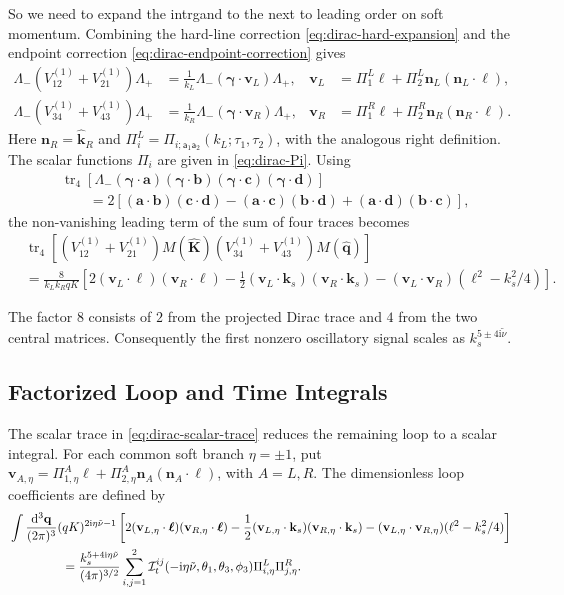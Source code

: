 \documentclass[a4paper,12pt]{article}
\newcommand{\ii}{\mathrm i}
\newcommand{\mb}{\mathbf}
\newcommand{\tn}{\tilde\nu}
\def\aa{\mathsf a}
\newcommand{\di}{\mathrm d}
\newcommand{\tr}{\operatorname{tr}}
\begin{document}
So we need to expand the intrgand to the next to leading order on soft momentum.
Combining the hard-line correction \eqref{eq:dirac-hard-expansion}
and the endpoint correction \eqref{eq:dirac-endpoint-correction} gives
\begin{align}
 \Lambda_-(V_{12}^{(1)}+V_{21}^{(1)})\Lambda_+
 &=\frac1{k_L}\Lambda_-
       (\bm\gamma\cdot\mb v_L)\Lambda_+,
 &\mb v_L&=\Pi^L_1\bm\ell
       +\Pi^L_2\mb n_L(\mb n_L\cdot\bm\ell),\nonumber\\
 \Lambda_-(V_{34}^{(1)}+V_{43}^{(1)})\Lambda_+
 &=\frac1{k_R}\Lambda_-
       (\bm\gamma\cdot\mb v_R)\Lambda_+,
 &\mb v_R&=\Pi^R_1\bm\ell
       +\Pi^R_2\mb n_R(\mb n_R\cdot\bm\ell).
 \label{eq:dirac-first-order}
\end{align}
Here $\mb n_R=\widehat{\mb k}_R$ and
$\Pi_i^L=\Pi_{i;\aa_1\aa_2}(k_L;\tau_1,\tau_2)$, with the analogous
right definition. The scalar functions $\Pi_i$ are given in
\eqref{eq:dirac-Pi}. Using
\begin{align}
 &\tr_4[\Lambda_-(\bm\gamma\cdot\mb a)
 (\bm\gamma\cdot\mb b)(\bm\gamma\cdot\mb c)
 (\bm\gamma\cdot\mb d)]\nonumber\\
 &\qquad=2[(\mb a\cdot\mb b)(\mb c\cdot\mb d)
 -(\mb a\cdot\mb c)(\mb b\cdot\mb d)
 +(\mb a\cdot\mb d)(\mb b\cdot\mb c)],
 \label{eq:dirac-four-gamma-trace}
\end{align}
the non-vanishing leading term of the sum of four traces becomes
\begin{align}
 &\tr_4[(V_{12}^{(1)}+V_{21}^{(1)})M(\widehat{\mb K})
        (V_{34}^{(1)}+V_{43}^{(1)})M(\widehat{\mb q})]
 \nonumber\\
 &=\frac{8}{k_Lk_RqK}\left[
 2(\mb v_L\cdot\bm\ell)(\mb v_R\cdot\bm\ell)
 -\frac12(\mb v_L\cdot\mb k_s)(\mb v_R\cdot\mb k_s)
 -(\mb v_L\cdot\mb v_R)(\ell^2-k_s^2/4)\right].
 \label{eq:dirac-scalar-trace}
\end{align}

The factor $8$ consists of $2$ from the projected Dirac trace and
$4$ from the two central matrices. Consequently the first nonzero
oscillatory signal scales as $k_s^{5\pm4\ii\tn}$.

\subsection{Factorized Loop and Time Integrals}
\label{sec:dirac-factorized}
The scalar trace in \eqref{eq:dirac-scalar-trace} reduces the
remaining loop to a scalar integral. 
For each common soft branch $\eta=\pm1$, put
$\mb v_{A,\eta}=\Pi^A_{1,\eta}\bm\ell
+\Pi^A_{2,\eta}\mb n_A(\mb n_A\cdot\bm\ell)$, with $A=L,R$.
The dimensionless loop coefficients are defined by
\begin{align}
 &\int\frac{\di^3\mb q}{(2\pi)^3}(qK)^{2\ii\eta\tn-1}
 \left[2(\mb v_{L,\eta}\cdot\bm\ell)(\mb v_{R,\eta}\cdot\bm\ell)
 -\frac12(\mb v_{L,\eta}\cdot\mb k_s)(\mb v_{R,\eta}\cdot\mb k_s)
 -(\mb v_{L,\eta}\cdot\mb v_{R,\eta})(\ell^2-k_s^2/4)\right]\nonumber\\
 &\hspace{15mm}=\frac{k_s^{5+4\ii\eta\tn}}{(4\pi)^{3/2}}
 \sum_{i,j=1}^2\mathcal I^{ij}_t(-\ii\eta\tn,\theta_1,\theta_3,\phi_3)
 \Pi^L_{i,\eta}\Pi^R_{j,\eta}.
 \label{eq:dirac-loop-definition}
\end{align}
\end{document}
